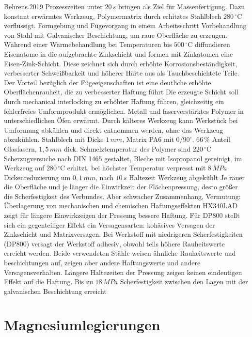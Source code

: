 Behrens.2019
Prozesszeiten unter $20 \, s$ bringen als Ziel für Massenfertigung. Dazu konstant erwärmtes Werkzeug, Polymermatrix durch erhitztes Stahlblech $280 \, ^\circ \text{C}$ verflüssigt. Formgebung und Fügevorgang in einem Arbeitsschritt
Vorbehandlung von Stahl mit Galvanischer Beschichtung, um raue Oberfläche zu erzeugen. Während einer Wärmebehandlung bei Temperaturen bis $500 \, ^\circ \text{C}$ diffundieren Eisenatome in die aufgebrachte Zinkschicht und formen mit Zinkatomen eine Eisen-Zink-Schicht. Diese zeichnet sich durch erhöhte Korrosionsbeständigkeit, verbesserter Schweißbarkeit und höherer Härte aus als Tauchbeschichtete Teile. Der Vorteil bezüglich der Fügeeigenschaften ist eine deutliche erhöhte Oberflächenrauheit, die zu verbesserter Haftung führt \cite{XXX 12,13 nach Behrens.2019}
Die erzeugte Schicht soll durch mechanical interlocking zu erhöhter Haftung führen, gleichzeitig ein fehlerfreies Umformprodukt ermöglichen.
Metall und faserverstärktes Polymer in unterschiedlichen Öfen erwärmt. Durch kälteres Werkzeug kann Werkstück bei Umformung abkühlen und direkt entnommen werden, ohne das Werkzeug abzukühlen. 
Stahlblech mit Dicke $1 \, mm$, Matrix PA6 mit $0/90 ^\circ$, $66\,\%$ Anteil Glasfasern, $1,5 \, mm$ dick. Schmelztemperatur des Polymer sind $220 \, ^\circ \text{C}$
Scherzugversuche nach DIN 1465 gestaltet, Bleche mit Isopropanol gereinigt, im Werkzeug auf $280 \, ^\circ\text{C}$ erhitzt, bei höchster Temperatur verpresst mit $8 \, MPa$
Dickenreduzierung um $0,1 \, mm$, nach $10 \, s$ Haltezeit Werkzeug abgekühlt
Je rauer die Oberfläche und je länger die Einwirkzeit der Flächenpressung, desto größer die Scherfestigkeit des Verbundes. Aber schwacher Zusammenhang, Vermutung: Überlagerung von mechanischen und chemischen Haftungseffekten 
HX340LAD zeigt für längere Einwirkzeigen der Pressung bessere Haftung. Für DP800 stellt sich ein gegenteiliger Effekt ein
Versagensarten: kohäsives Versagen der Zinkschicht und Matrixversagen. Bei Werkstoff mit niedrigeren Scherfestigkeiten (DP800) versagt der Werkstoff adhesiv, obwohl teils höhere Rauheitswerte erreicht werden. Beide verwendeten Stähle weisen ähnliche Rauheitswerte und beschichtungen auf, zeigen aber andere Haftungswerte und andere Versagensverhalten. Längere Haltezeiten der Pressung zeigen keinen eindeutigen Effekt auf die Haftung.
Bis zu $18 \, MPa$ Scherfestigkeit zwischen den Lagen mit der galvanischen Beschichtung erreicht


\section{Magnesiumlegierungen}\label{sec:Mg}

